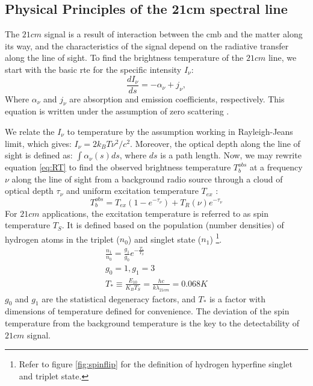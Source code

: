 \documentclass[12pt, TexShade, letterpaper]{report}
\begin{document}
\subsection{Physical Principles of the 21cm spectral line}
The $21cm$ signal is a result of interaction between the \gls{cmb} and the matter along its way, and the characteristics of the signal depend on the radiative transfer along the line of sight. To find the brightness temperature of the $21cm$ line, we start with the basic \gls{rte} for the specific intensity $I_{\nu}$:
\begin{equation}
    \frac{dI_\nu}{ds} = - \alpha_\nu + j_\nu ,
    \label{eq:RT}
\end{equation}
Where $\alpha_\nu$ and $j_\nu$ are absorption and emission coefficients, respectively. This equation is written under the assumption of zero scattering \cite{21century, low_frequency}. \par
We relate the $I_\nu$ to temperature by the assumption working in Rayleigh-Jeans limit, which gives: $I_\nu = 2k_B T \nu^2 /c^2$. Moreover, the optical depth along the line of sight is defined as: $\int \alpha_\nu \left(s\right) ds$, where $ds$ is a path length. Now, we may rewrite equation \ref{eq:RT} to find the observed brightness temperature $T^{obs}_b$ at a frequency $\nu$ along the line of sight from a background radio source through a cloud of optical depth $\tau_\nu$ and uniform excitation temperature $T_{ex}$ \cite{21century, low_frequency}:
\begin{equation}
    T^{obs}_b = T_{ex} \left(1-e^{-\tau_\nu} \right) + T_R \left (\nu \right) e ^{-\tau_\nu}
\end{equation}
For $21cm$ applications, the excitation temperature is referred to as spin temperature $T_S$. It is defined based on the population (number densities) of hydrogen atoms in the triplet ($n_0$) and singlet state ($n_1$) \footnote{Refer to figure \ref{fig:spinflip} for the definition of hydrogen hyperfine singlet and triplet state.}\cite{21century, low_frequency}.
\begin{gather}
    \frac{n_1}{n_0} = \frac{g_1}{g_0} e ^ {-\frac{T_*}{T_S}}\\
    g_0 =1, g_1 =3\\
     T_* \equiv \frac{E_{10}}{K_B T_S} = \frac {hc}{k\lambda_{21cm}} = 0.068 K
\end{gather}
$g_0$ and $g_1$ are the statistical degeneracy factors, and $T_*$ is a factor with dimensions of temperature defined for convenience. The deviation of the spin temperature from the background temperature is the key to the detectability of $21cm$ signal.\par
\end{document}
